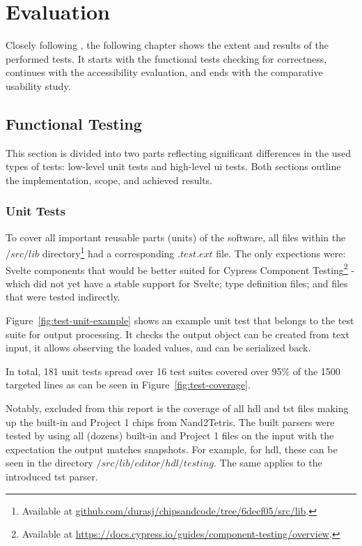 \chapter{Evaluation}
\label{Evaluation}

Closely following , the following chapter shows the extent and results of the performed tests.
It starts with the functional tests checking for correctness, continues with the accessibility evaluation, and ends with the comparative usability study.

\section{Functional Testing}
\label{Evaluation-Tests}

This section is divided into two parts reflecting significant differences in the used types of tests: low-level unit tests and high-level \gls{ui} tests.
Both sections outline the implementation, scope, and achieved results.

\subsection{Unit Tests}
\label{sec:evaluation-unit-tests}

To cover all important reusable parts (units) of the software, all files within the $/src/lib$ directory\footnote{Available at \href{https://github.com/durasj/chipsandcode/tree/6decf05115ba1d4ca927de42f63c8431b1ac3124/src/lib}{github.com/durasj/chipsandcode/tree/6decf05/src/lib}.} had a corresponding $.test.ext$ file.
The only expections were: Svelte components that would be better suited for Cypress Component Testing\footnote{Available at \url{https://docs.cypress.io/guides/component-testing/overview}.} - which did not yet have a stable support for Svelte; type definition files; and files that were tested indirectly.

Figure~\ref{fig:test-unit-example} shows an example unit test that belongs to the test suite for output processing.
It checks the output object can be created from text input, it allows observing the loaded values, and can be serialized back.

In total, 181 unit tests spread over 16 test suites covered over 95\% of the 1500 targeted lines as can be seen in Figure~\ref{fig:test-coverage}.

Notably, excluded from this report is the coverage of all \gls{hdl} and \gls{tst} files making up the built-in and Project 1 chips from Nand2Tetris.
The built parsers were tested by using all (dozens) built-in and Project 1 files on the input with the expectation the output matches snapshots.
For example, for \gls{hdl}, these can be seen in the directory $/src/lib/editor/hdl/testing$.
The same applies to the introduced \gls{tst} parser.

